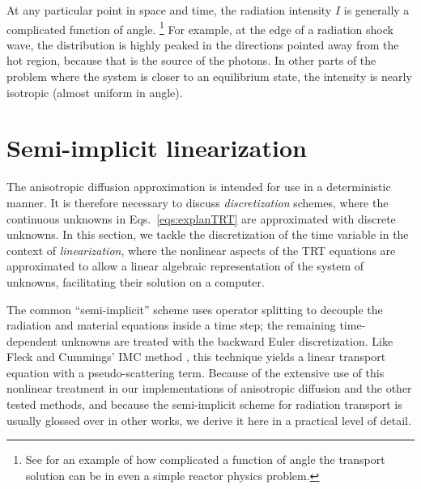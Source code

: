 At any particular point in space and time, the radiation intensity $I$ is
generally a complicated function of angle.%
\footnote{See \cite{Ada2001a} for an example of how complicated a function of
angle the transport solution can be in even a simple reactor physics problem.}
For example, at the edge of a
radiation shock wave, the distribution is highly peaked in the directions
pointed away from the hot region, because that is the source of the photons. In
other parts of the problem where the system is closer to an equilibrium state,
the intensity is nearly isotropic (almost uniform in angle).

\section{Semi-implicit linearization}\label{sec:bgSemiImplicit}

The anisotropic diffusion approximation is intended for use in a deterministic
manner. It is therefore necessary to discuss \emph{discretization} schemes,
where the continuous unknowns in Eqs.~\eqref{eqs:explanTRT} are approximated
with discrete unknowns. In this section, we tackle the discretization of the
time variable in the context of \emph{linearization}, where the nonlinear
aspects of the TRT equations are approximated to allow a linear algebraic
representation of the system of unknowns, facilitating their solution on a
computer.

The common
``semi-implicit'' scheme \cite{Kno1999a,Kno2001,Low2004} uses operator splitting
to decouple the radiation and material equations inside a time step; the
remaining time-dependent unknowns are treated with the backward Euler
discretization.
Like Fleck and Cummings' IMC method \cite{Fle1971}, this technique
yields a linear transport equation with a pseudo-scattering term. Because of the
extensive use of this
nonlinear treatment in our implementations of anisotropic diffusion and the
other tested methods, and because the semi-implicit scheme for radiation
transport is usually glossed over in other works, we derive
it here in a practical level of detail.

